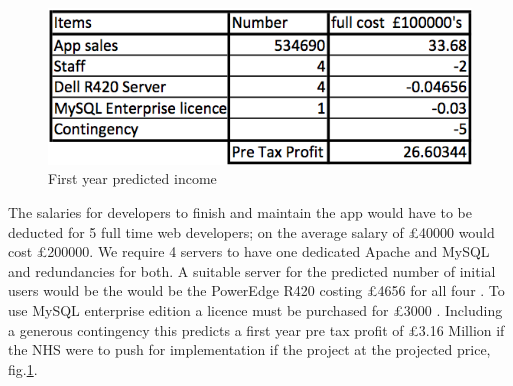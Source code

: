 \documentclass[11pt]{article}
\begin{document}
\begin{figure}
\centering
\includegraphics[scale=0.4]{costing.png}
\caption{First year predicted income \label{costing}} 
\end{figure}
The salaries for developers to finish and maintain the app would have to be deducted for 5 full time web developers; on the average salary of \pounds 40000 \cite{salary} would cost \pounds 200000. We require 4 servers to have one dedicated Apache and MySQL and redundancies for both. A suitable server for the predicted number of initial users would be the  would be the PowerEdge R420 costing \pounds4656 for all four \cite{dell}. To use MySQL enterprise edition a licence must be purchased for \pounds3000 \cite{MySQL}. Including a generous contingency this predicts a first year pre tax profit of \pounds3.16 Million if the NHS were to push for implementation if the project at the projected price, fig.\ref{costing}.

\end{document}
